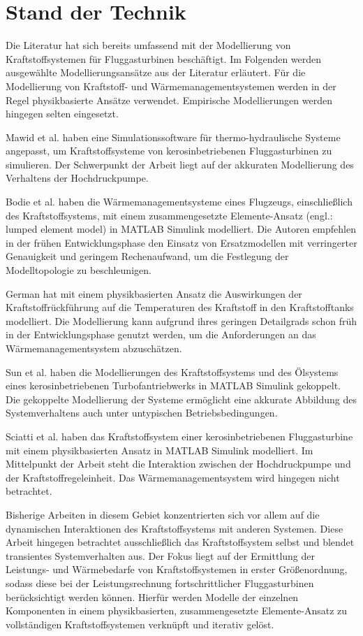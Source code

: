 \chapter{Stand der Technik}\label{chap:standdertechnik}

Die Literatur hat sich bereits umfassend mit der Modellierung von Kraftstoffsystemen für Fluggasturbinen beschäftigt. Im Folgenden werden ausgewählte Modellierungsansätze aus der Literatur erläutert. Für die Modellierung von Kraftstoff- und Wärmemanagementsystemen werden in der Regel physikbasierte Ansätze verwendet. Empirische Modellierungen werden hingegen selten eingesetzt. 

Mawid et al. \cite{Mawid.1998} haben eine Simulationssoftware für thermo-hydraulische Systeme angepasst, um  Kraftstoffsysteme von kerosinbetriebenen Fluggasturbinen zu simulieren. Der Schwerpunkt der Arbeit liegt auf der akkuraten Modellierung des Verhaltens der Hochdruckpumpe.

Bodie et al. \cite{Bodie.2010} haben die Wärmemanagementsysteme eines Flugzeugs, einschließlich des Kraftstoffsystems, mit einem zusammengesetzte Elemente-Ansatz (engl.: lumped element model) in MATLAB Simulink modelliert. Die Autoren empfehlen in der frühen Entwicklungsphase den Einsatz von Ersatzmodellen mit verringerter Genauigkeit und geringem Rechenaufwand, um die Festlegung der Modelltopologie zu beschleunigen.

German \cite{German.2012} hat mit einem physikbasierten Ansatz die Auswirkungen der Kraftstoffrückführung auf die Temperaturen des Kraftstoff in den Kraftstofftanks modelliert. Die Modellierung kann aufgrund ihres geringen Detailgrads schon früh in der Entwicklungsphase genutzt werden, um die Anforderungen an das Wärmemanagementsystem abzuschätzen.

Sun et al. \cite{Sun.2019} haben die Modellierungen des Kraftstoffsystems und des Ölsystems eines kerosinbetriebenen Turbofantriebwerks in MATLAB Simulink gekoppelt. Die gekoppelte Modellierung der Systeme ermöglicht eine akkurate Abbildung des Systemverhaltens auch unter untypischen Betriebsbedingungen.

Sciatti et al. \cite{Sciatti.2022} haben das Kraftstoffsystem einer kerosinbetriebenen Fluggasturbine mit einem physikbasierten Ansatz in MATLAB Simulink modelliert. Im Mittelpunkt der Arbeit steht die Interaktion zwischen der Hochdruckpumpe und der Kraftstoffregeleinheit. Das Wärmemanagementsystem wird hingegen nicht betrachtet. 

Bisherige Arbeiten in diesem Gebiet konzentrierten sich vor allem auf die dynamischen Interaktionen des Kraftstoffsystems mit anderen Systemen. Diese Arbeit hingegen betrachtet ausschließlich das Kraftstoffsystem selbst und blendet transientes Systemverhalten aus. Der Fokus liegt auf der Ermittlung der Leistungs- und Wärmebedarfe von Kraftstoffsystemen in erster Größenordnung, sodass diese bei der Leistungsrechnung fortschrittlicher Fluggasturbinen berücksichtigt werden können. Hierfür werden Modelle der einzelnen Komponenten in einem physikbasierten, zusammengesetzte Elemente-Ansatz zu vollständigen Kraftstoffsystemen verknüpft und iterativ gelöst.